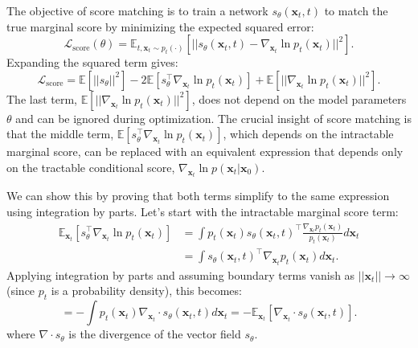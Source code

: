 \documentclass{article}
\begin{document}
The objective of score matching is to train a network $s_\theta(\mathbf{x}_t, t)$ to match the true marginal score by minimizing the expected squared error:
\begin{equation}
\mathcal{L}_{\text{score}}(\theta) = \mathbb{E}_{t, \mathbf{x}_t \sim p_t(\cdot)} \left[ || s_\theta(\mathbf{x}_t, t) - \nabla_{\mathbf{x}_t} \ln p_t(\mathbf{x}_t) ||^2 \right].
\end{equation}
Expanding the squared term gives:
\begin{equation}
\mathcal{L}_{\text{score}} = \mathbb{E}[||s_\theta||^2] - 2\mathbb{E}[s_\theta^\top \nabla_{\mathbf{x}_t} \ln p_t(\mathbf{x}_t)] + \mathbb{E}[||\nabla_{\mathbf{x}_t} \ln p_t(\mathbf{x}_t)||^2].
\end{equation}
The last term, $\mathbb{E}[||\nabla_{\mathbf{x}_t} \ln p_t(\mathbf{x}_t)||^2]$, does not depend on the model parameters $\theta$ and can be ignored during optimization. The crucial insight of score matching is that the middle term, $\mathbb{E}[s_\theta^\top \nabla_{\mathbf{x}_t} \ln p_t(\mathbf{x}_t)]$, which depends on the intractable marginal score, can be replaced with an equivalent expression that depends only on the tractable conditional score, $\nabla_{\mathbf{x}_t} \ln p(\mathbf{x}_t | \mathbf{x}_0)$.

We can show this by proving that both terms simplify to the same expression using integration by parts. Let's start with the intractable marginal score term:
\begin{align*}
\mathbb{E}_{\mathbf{x}_t}[s_\theta^\top \nabla_{\mathbf{x}_t} \ln p_t(\mathbf{x}_t)] &= \int p_t(\mathbf{x}_t) s_\theta(\mathbf{x}_t, t)^\top \frac{\nabla_{\mathbf{x}_t} p_t(\mathbf{x}_t)}{p_t(\mathbf{x}_t)} d\mathbf{x}_t \\
&= \int s_\theta(\mathbf{x}_t, t)^\top \nabla_{\mathbf{x}_t} p_t(\mathbf{x}_t) d\mathbf{x}_t.
\end{align*}
Applying integration by parts and assuming boundary terms vanish as $||\mathbf{x}_t|| \to \infty$ (since $p_t$ is a probability density), this becomes:
\begin{equation} \label{eq:score_identity}
= -\int p_t(\mathbf{x}_t) \nabla_{\mathbf{x}_t} \cdot s_\theta(\mathbf{x}_t, t) d\mathbf{x}_t = -\mathbb{E}_{\mathbf{x}_t}[\nabla_{\mathbf{x}_t} \cdot s_\theta(\mathbf{x}_t, t)].
\end{equation}
where $\nabla \cdot s_\theta$ is the divergence of the vector field $s_\theta$.
\end{document}
